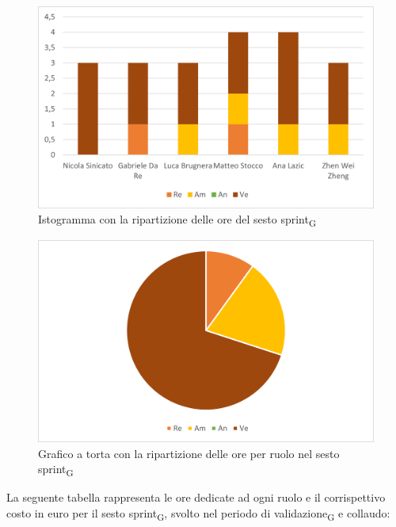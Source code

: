 \begin{figure}[H]
	\centering
	\includegraphics[scale=0.6]{img/grafi preventivo/istogrammi/analisi/sprint6.png}
	\caption{Istogramma con la ripartizione delle ore del sesto sprint\textsubscript{G}}
\end{figure}
\begin{figure}[H]
	\centering
	\includegraphics[scale=0.6]{img/grafi preventivo/torta/analisi/sprint6.png}
	\caption{Grafico a torta con la ripartizione delle ore per ruolo nel sesto sprint\textsubscript{G}}
\end{figure}
La seguente tabella rappresenta le ore dedicate ad ogni ruolo e il corrispettivo costo in euro per il sesto sprint\textsubscript{G}, svolto nel periodo di validazione\textsubscript{G} e collaudo:

